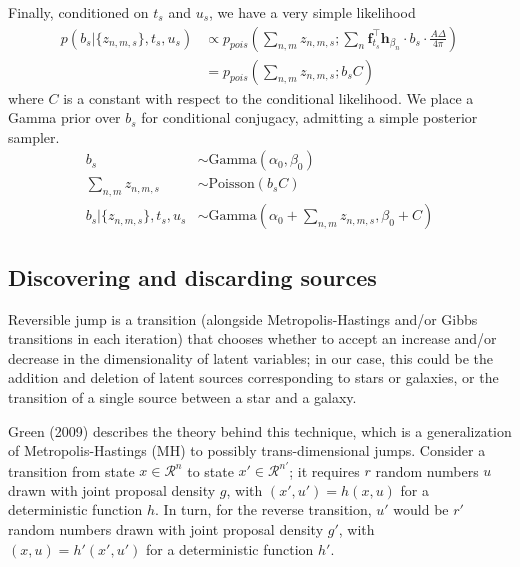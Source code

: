 \documentclass[11pt]{article}
\newcommand{\trans}{\intercal}
\begin{document}
Finally, conditioned on $t_s$ and $u_s$, we have a very simple likelihood
\begin{align}
  p(b_s | \{z_{n,m,s}\}, t_s, u_s) 
    &\propto p_{pois}\left( \sum_{n,m} z_{n,m,s}; \sum_{n} \mathbf{f}_{t_s}^\trans \mathbf{h}_{\beta_n} \cdot b_s \cdot \frac{A \Delta}{4 \pi} \right) \\
    &= p_{pois}\left( \sum_{n,m} z_{n,m,s};  b_s C \right)
\end{align}
where $C$ is a constant with respect to the conditional likelihood.  We place a Gamma prior over $b_s$ for conditional conjugacy, admitting a simple posterior sampler. 
\begin{align}
  b_s &\sim \textrm{Gamma}(\alpha_0, \beta_0) \\
  \sum_{n,m} z_{n,m,s} &\sim \textrm{Poisson}(b_s C) \\
  b_s | \{z_{n,m,s}\}, t_s, u_s &\sim \textrm{Gamma}\left(\alpha_0 + \sum_{n,m}z_{n,m,s}, \beta_0 + C\right)
\end{align}

\subsection{Discovering and discarding sources}

Reversible jump is a transition (alongside Metropolis-Hastings and/or
Gibbs transitions in each iteration) that chooses whether to accept
an increase and/or decrease in the dimensionality of latent variables;
in our case, this could be the addition and deletion of latent sources
corresponding to stars or galaxies, or the transition of a single
source between a star and a galaxy.

Green (2009) describes the theory behind this technique, which is
a generalization of Metropolis-Hastings (MH) to possibly trans-dimensional
jumps. Consider a transition from state $x\in\mathcal{R}^{n}$ to
state $x'\in\mathcal{R}^{n'}$; it requires $r$ random numbers $u$
drawn with joint proposal density $g$, with $\left(x',u'\right)=h\left(x,u\right)$
for a deterministic function $h$. In turn, for the reverse transition,
$u'$ would be $r'$ random numbers drawn with joint proposal density
$g'$, with $\left(x,u\right)=h'\left(x',u'\right)$ for a deterministic
function $h'$.
\end{document}
